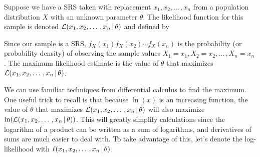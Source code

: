 \begin{defn}Suppose we have a SRS taken with replacement $x_1, x_2, \dots \,,x_n$ from a population distribution $X$ with an unknown parameter $\theta$. The likelihood function for this sample is denoted $\mathcal{L}(x_1,x_2,\dots\,,x_n \,|\, \theta)$ and defined by
\end{defn}
\par
Since our sample is a SRS, $f_X(x_1)f_X(x_2)\cdots f_X(x_n)$ is the probability (or probability density) of observing the sample values $X_1 = x_1, X_2  = x_2, \dots\,, X_n = x_n$. The maximum likelihood estimate is the value of $\theta$ that maximizes $\mathcal{L}(x_1,x_2,\dots\,,x_n \,|\, \theta)$.
\par
We can use familiar techniques from differential calculus to find the maximum. One useful trick to recall is that because $\ln(x)$ is an increasing function, the value of $\theta$ that maximizes $\mathcal{L}(x_1,x_2,\dots\,,x_n \,|\, \theta)$ will also maximize $\ln(\mathcal{L}(x_1,x_2,\dots\,,x_n \,|\, \theta))$. This will greatly simplify calculations since the logarithm of a product can be written as a sum of logarithms, and derivatives of sums are much easier to deal with. To take advantage of this, let's denote the log-likelihood with $\ell(x_1,x_2,\dots\,,x_n \,|\, \theta)$.

